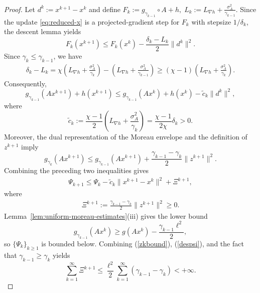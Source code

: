 \documentclass[11pt]{article}
\numberwithin{equation}{section}
\begin{document}
\begin{proof}
Let $d^k:=x^{k+1}-x^k$ and define
$
    F_k:=g_{\gamma_{k-1}}\circ A+h,
    \;
    L_k:=L_{\nabla h}+\frac{\sigma_A^2}{\gamma_{k-1}}.
$
Since
the update \eqref{eq:reduced-x} is a
projected-gradient step for $F_k$ with stepsize $1/\delta_k$,
 the descent lemma yields
\[
    F_k(x^{k+1})
    \leq
    F_k(x^k)
    -
    \frac{\delta_k-L_k}{2}\|d^k\|^2.
\]
Since $\gamma_k\leq\gamma_{k-1}$, we have
\[
\begin{aligned}
    \delta_k-L_k
    =
    \chi\left(
        L_{\nabla h}+\frac{\sigma_A^2}{\gamma_k}
    \right)
    -
    \left(
        L_{\nabla h}+\frac{\sigma_A^2}{\gamma_{k-1}}
    \right)                                                  
    \geq
    (\chi-1)
    \left(
        L_{\nabla h}+\frac{\sigma_A^2}{\gamma_k}
    \right).
\end{aligned}
\]
Consequently,
\[
    g_{\gamma_{k-1}}(Ax^{k+1})+h(x^{k+1})
    \leq
    g_{\gamma_{k-1}}(Ax^k)+h(x^k)
    -
    \widetilde c_k\|d^k\|^2,
\]
where
\[
    \widetilde c_k
    :=
    \frac{\chi-1}{2}
    \left(
        L_{\nabla h}+\frac{\sigma_A^2}{\gamma_k}
    \right)
    =
    \frac{\chi-1}{2\chi}\delta_k
    >0.
\]
Moreover, the dual representation of the Moreau envelope and the
definition of $z^{k+1}$ imply
\[
    g_{\gamma_k}(Ax^{k+1})
    \leq
    g_{\gamma_{k-1}}(Ax^{k+1})
    +
    \frac{\gamma_{k-1}-\gamma_k}{2}
    \|z^{k+1}\|^2.
\]
Combining the preceding two inequalities gives
\begin{eqnarray}\label{despsi}
    \Psi_{k+1}
    \leq
    \Psi_k-\widetilde c_k\|x^{k+1}-x^k\|^2
    +\Xi^{k+1},
\end{eqnarray}
 where
\begin{eqnarray*}
\Xi^{k+1} := \frac{\gamma_{k-1}-\gamma_{k}}{2}\|{z}^{k+1}\|^2 \geq 0.
\end{eqnarray*}
\noindent Lemma~\ref{lem:uniform-moreau-estimates}(iii) gives the lower bound
\[
    g_{\gamma_{k-1}}\!\left(Ax^k\right)
    \geq
    g\!\left(Ax^k\right)
    -
    \frac{\gamma_{k-1}\ell^2}{2},
\]
so $\{\Psi_k\}_{k\ge 1}$ is bounded below. Combining (\ref{zkbound}), (\ref{despsi}), and the fact that
$\gamma_{k-1}\geq\gamma_k$ yields
$$
    \sum_{k=1}^{\infty} \Xi^{k+1}
    \leq
    \frac{\ell^2}{2}
    \sum_{k=1}^{\infty}\left(\gamma_{k-1}-\gamma_k\right)
    <+\infty.
$$


\end{proof}
\end{document}

